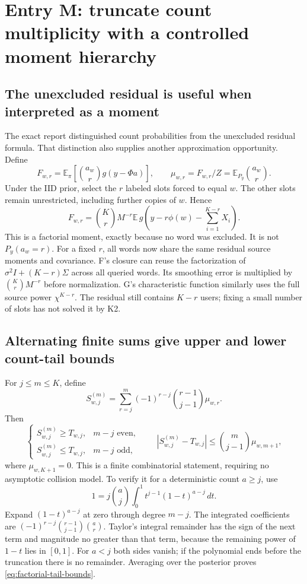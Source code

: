 \documentclass[10pt,a4paper]{article}
\newcommand{\E}{\mathbb E}
\begin{document}
\clearpage
\section{Entry M: truncate count multiplicity with a controlled moment hierarchy}
\label{sec:factorial-moments}
\subsection{The unexcluded residual is useful when interpreted as a moment}
The exact report distinguished count probabilities from the unexcluded residual formula. That distinction
also supplies another approximation opportunity. Define
\[
 F_{w,r}=\E_\pi\!\left[\binom{a_w}{r}g(y-\Phi a)\right],\qquad
 \mu_{w,r}=F_{w,r}/Z=\E_{P_y}\binom{a_w}{r}.
\]
Under the IID prior, select the $r$ labeled slots forced to equal $w$. The other slots remain unrestricted,
including further copies of $w$. Hence
\begin{equation}
 F_{w,r}=\binom Kr M^{-r}
  \E\,g\!\left(y-r\phi(w)-\sum_{i=1}^{K-r}X_i\right).
 \label{eq:factorial-residual}
\end{equation}
This is a factorial moment, exactly because no word was excluded. It is not $P_y(a_w=r)$.
For a fixed $r$, all words now share the same residual source moments and covariance. F's closure can reuse
the factorization of $\sigma^2I+(K-r)\Sigma$ across all queried words. Its smoothing error is multiplied by
$\binom Kr M^{-r}$ before normalization. G's characteristic function similarly uses the full source power
$\chi^{K-r}$. The residual still contains $K-r$ users; fixing a small number of slots has not solved it by K2.

\subsection{Alternating finite sums give upper and lower count-tail bounds}
For $j\leq m\leq K$, define
\[
 S_{w,j}^{(m)}=\sum_{r=j}^m(-1)^{r-j}\binom{r-1}{j-1}\mu_{w,r}.
\]
Then
\begin{equation}
 \begin{cases}
 S_{w,j}^{(m)}\geq T_{w,j},&m-j\text{ even},\\
 S_{w,j}^{(m)}\leq T_{w,j},&m-j\text{ odd},
 \end{cases}\qquad
 |S_{w,j}^{(m)}-T_{w,j}|\leq\binom m{j-1}\mu_{w,m+1},
 \label{eq:factorial-tail-bounds}
\end{equation}
where $\mu_{w,K+1}=0$. This is a finite combinatorial statement, requiring no asymptotic collision model.
To verify it for a deterministic count $a\geq j$, use
\[
 1=j\binom aj\int_0^1 t^{j-1}(1-t)^{a-j}\,dt.
\]
Expand $(1-t)^{a-j}$ at zero through degree $m-j$. The integrated coefficients are
$(-1)^{r-j}\binom{r-1}{j-1}\binom ar$. Taylor's integral remainder has the sign of the next term and
magnitude no greater than that term, because the remaining power of $1-t$ lies in $[0,1]$.
For $a<j$ both sides vanish; if the polynomial ends before the truncation there is no remainder.
Averaging over the posterior proves \eqref{eq:factorial-tail-bounds}.
\end{document}
